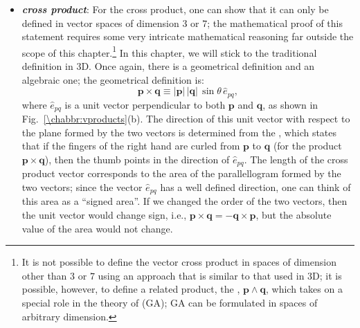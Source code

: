 \begin{itemize}
	\item \textbf{\textit{cross product}}: For the cross product, one can show that it can only be defined in vector spaces of dimension $3$ or $7$;  the mathematical proof of this statement requires some very intricate mathematical reasoning far outside the scope of this chapter.\footnote{It is not possible to define the vector cross product in spaces of dimension other than $3$ or $7$ using an approach that is similar to that used in 3D; it is possible, however, to define a related product, the , $\mathbf{p}\wedge\mathbf{q}$, which takes on a special role in the theory of  (GA); GA can be formulated in spaces of arbitrary dimension.}  In this chapter, we will stick to the traditional definition in 3D.  Once again, there is a geometrical definition and an algebraic one; the geometrical definition is:
	\begin{equation}
		\mathbf{p}\times\mathbf{q} \equiv \vert\mathbf{p}\vert\,\vert\mathbf{q}\vert\,\sin\theta\, \hat{e}_{pq},
	\end{equation}
	where $\hat{e}_{pq}$ is a unit vector perpendicular to both $\mathbf{p}$ and $\mathbf{q}$, as shown in Fig.~\ref{\chabbr:vproducts}(b).  The direction of this unit vector with respect to the plane formed by the two vectors is determined from the , which states that if the fingers of the right hand are curled from $\mathbf{p}$ to $\mathbf{q}$ (for the product $\mathbf{p}\times\mathbf{q}$), then the thumb points in the direction of $\hat{e}_{pq}$. The length of the cross product vector corresponds to the area of the parallellogram formed by the two vectors; since the vector $\hat{e}_{pq}$ has a well defined direction, one can think of this area as a ``signed area''.  If we changed the order of the two vectors, then the unit vector would change sign, i.e., $\mathbf{p}\times\mathbf{q}=-\mathbf{q}\times\mathbf{p}$, but the absolute value of the area would not change.
	

\end{itemize}
